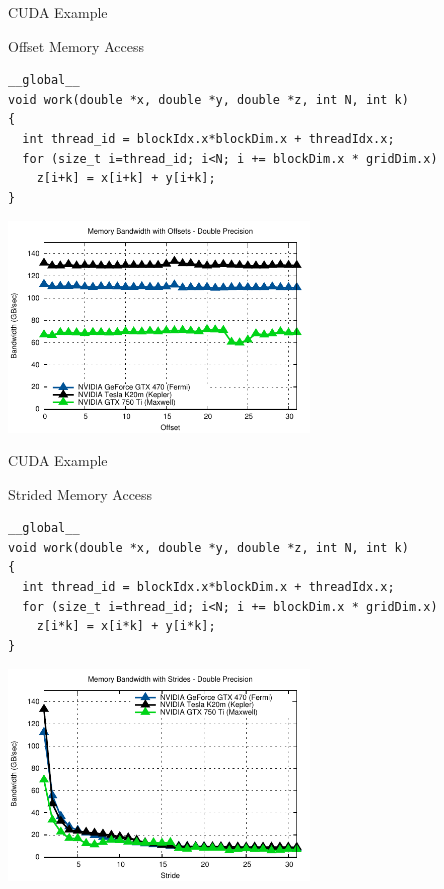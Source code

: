 \begin{frame}[fragile]{CUDA Example}

\begin{block}{Offset Memory Access}
  \begin{lstlisting}
__global__ 
void work(double *x, double *y, double *z, int N, int k)
{
  int thread_id = blockIdx.x*blockDim.x + threadIdx.x;
  for (size_t i=thread_id; i<N; i += blockDim.x * gridDim.x)
    z[i+k] = x[i+k] + y[i+k];
}  
  \end{lstlisting}
\end{block}

\vspace*{-0.5cm}
\begin{center}
 \includegraphics[width=0.6\textwidth]{figures/offset}
\end{center}

\end{frame}




\begin{frame}[fragile]{CUDA Example}

\begin{block}{Strided Memory Access}
  \begin{lstlisting}
__global__ 
void work(double *x, double *y, double *z, int N, int k)
{
  int thread_id = blockIdx.x*blockDim.x + threadIdx.x;
  for (size_t i=thread_id; i<N; i += blockDim.x * gridDim.x)
    z[i*k] = x[i*k] + y[i*k];
}  
  \end{lstlisting}
\end{block}

\vspace*{-0.5cm}
\begin{center}
 \includegraphics[width=0.6\textwidth]{figures/stride}
\end{center}

\end{frame}


